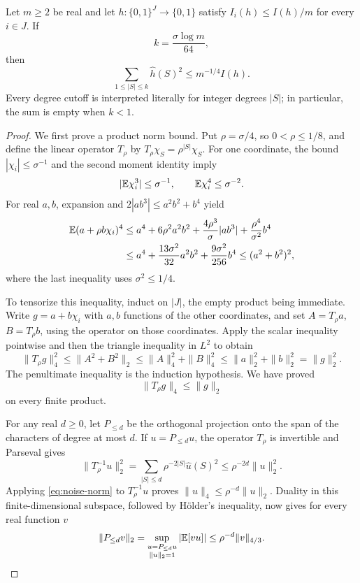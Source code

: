 \begin{samepage}
\begin{lemma}\label{lem:low-degree}
Let $m\ge2$ be real and let $h:\{0,1\}^J\to\{0,1\}$ satisfy
$I_i(h)\le I(h)/m$ for every $i\in J$. If
\[
  k=\frac{\sigma\log m}{64},
\]
then
\begin{equation}\label{eq:low-degree}
  \sum_{1\le |S|\le k}\widehat h(S)^2\le m^{-1/4}I(h).
\end{equation}
Every degree cutoff is interpreted literally for integer degrees $|S|$;
in particular, the sum is empty when $k<1$.
\end{lemma}
\end{samepage}

\begin{proof}
We first prove a product norm bound. Put $\rho=\sigma/4$, so
$0<\rho\le1/8$, and define the linear operator $T_\rho$ by
$T_\rho\chi_S=\rho^{|S|}\chi_S$. For one coordinate, the bound
$|\chi_i|\le\sigma^{-1}$ and the second moment identity imply
\[
  |\mathbb E\chi_i^3|\le\sigma^{-1},\qquad
  \mathbb E\chi_i^4\le\sigma^{-2}.
\]
For real $a,b$, expansion and
$2|ab^3|\le a^2b^2+b^4$ yield
\begin{align*}
  \mathbb E(a+\rho b\chi_i)^4
  &\le a^4+6\rho^2a^2b^2
       +\frac{4\rho^3}{\sigma}|ab^3|
       +\frac{\rho^4}{\sigma^2}b^4\\
  &\le a^4+\frac{13\sigma^2}{32}a^2b^2
       +\frac{9\sigma^2}{256}b^4
   \le(a^2+b^2)^2,
\end{align*}
where the last inequality uses $\sigma^2\le1/4$.

To tensorize this inequality, induct on $|J|$, the empty product being
immediate. Write $g=a+b\chi_i$ with $a,b$ functions of the other
coordinates, and set $A=T_\rho a$, $B=T_\rho b$, using the operator on
those coordinates. Apply the scalar inequality pointwise and then the
triangle inequality in $L^2$ to obtain
\[
  \|T_\rho g\|_4^2
  \le \|A^2+B^2\|_2
  \le \|A\|_4^2+\|B\|_4^2
  \le \|a\|_2^2+\|b\|_2^2
  =\|g\|_2^2.
\]
The penultimate inequality is the induction hypothesis. We have proved
\begin{equation}\label{eq:noise-norm}
  \|T_\rho g\|_4\le\|g\|_2
\end{equation}
on every finite product.

For any real $d\ge0$, let $P_{\le d}$ be the orthogonal projection onto
the span of the characters of degree at most $d$. If $u=P_{\le d}u$,
the operator $T_\rho$ is invertible and Parseval gives
\[
  \|T_\rho^{-1}u\|_2^2
  =\sum_{|S|\le d}\rho^{-2|S|}\widehat u(S)^2
  \le\rho^{-2d}\|u\|_2^2.
\]
Applying \eqref{eq:noise-norm} to $T_\rho^{-1}u$ proves
$\|u\|_4\le\rho^{-d}\|u\|_2$. Duality in this finite-dimensional
subspace, followed by H\"older's inequality, now gives for every real
function $v$
\begin{equation}\label{eq:projection-norm}
  \|P_{\le d}v\|_2
  =\sup_{\substack{u=P_{\le d}u\\\|u\|_2=1}}|\mathbb E[vu]|
  \le\rho^{-d}\|v\|_{4/3}.
\end{equation}


\end{proof}
